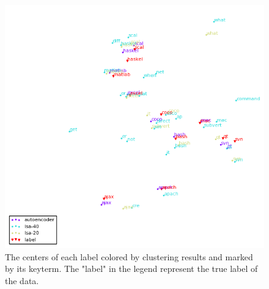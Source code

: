 \documentclass[12pt]{article}
\begin{document}
\begin{figure}
  \centering
  \includegraphics[width=0.9\linewidth]{centers.png}
  \caption{The centers of each label colored by clustering
  results and marked by its keyterm. The "label" in the
  legend represent the true label of the data.}
  \label{center}
\end{figure}
\end{document}
